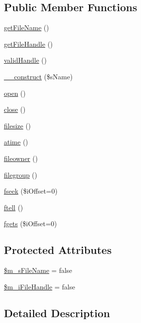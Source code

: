 \subsection*{Public Member Functions}
\begin{DoxyCompactItemize}
\item 
\hyperlink{classCPSFile_afdeebfe3fcf5806fc79c074a6a3a6eb1}{getFileName} ()
\item 
\hyperlink{classCPSFile_a1b1482c674bfd28271ba857daeb9199b}{getFileHandle} ()
\item 
\hyperlink{classCPSFile_aae2e3c4d391bb2351f514744bf7fba9e}{validHandle} ()
\item 
\hyperlink{classCPSFile_ad81e40515c7001c2a87387139b2a67de}{\_\-\_\-construct} (\$sName)
\item 
\hyperlink{classCPSFile_a44a2ac59a3b91f8c18905dce700934d6}{open} ()
\item 
\hyperlink{classCPSFile_aa69c8bf1f1dcf4e72552efff1fe3e87e}{close} ()
\item 
\hyperlink{classCPSFile_ae58f5bfc44861200aa7b5ccb9b7a096a}{filesize} ()
\item 
\hyperlink{classCPSFile_a168004cb787954e08154d53996c3b3a1}{atime} ()
\item 
\hyperlink{classCPSFile_a6395b5e84b44077d841d8515b8d0edb9}{fileowner} ()
\item 
\hyperlink{classCPSFile_abdd0b8e262c2a85a189c9bed3889ce9b}{filegroup} ()
\item 
\hyperlink{classCPSFile_aacd8c35344e506b2482ea295e9254efb}{fseek} (\$iOffset=0)
\item 
\hyperlink{classCPSFile_aae5813010acec168823283ed5d15d46c}{ftell} ()
\item 
\hyperlink{classCPSFile_a5b19ed5f237444f20db557482cef799e}{fgets} (\$iOffset=0)
\end{DoxyCompactItemize}
\subsection*{Protected Attributes}
\begin{DoxyCompactItemize}
\item 
\hyperlink{classCPSFile_a72ce389198502eabc1a52fb24abd8685}{\$m\_\-sFileName} = false
\item 
\hyperlink{classCPSFile_ae1c439cc9ed3168e874825f2f8e01dfc}{\$m\_\-iFileHandle} = false
\end{DoxyCompactItemize}


\subsection{Detailed Description}


